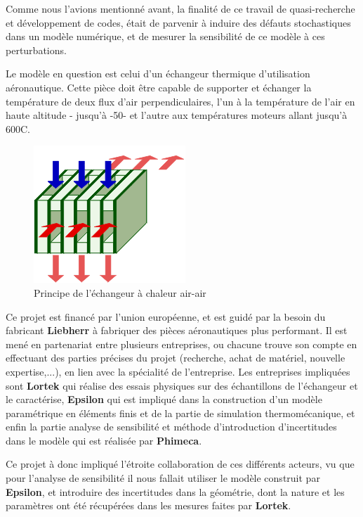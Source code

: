 \documentclass[a4paper,10pt]{article}
\begin{document}
Comme nous l'avions mentionné avant, la finalité de ce travail de quasi-recherche et développement de codes, était de parvenir à induire des défauts stochastiques dans un modèle numérique, et de mesurer la sensibilité de ce modèle à ces perturbations. 

Le modèle en question est celui d'un échangeur thermique d'utilisation aéronautique. Cette pièce doit être  capable de supporter et échanger la température de deux flux d'air perpendiculaires, l'un à la température de l'air en haute altitude - jusqu'à -50\degree - et l'autre aux températures moteurs allant jusqu'à 600C. \\

\begin{figure}[H]
   \centering   
   \includegraphics[scale=0.5]{principeEchangeur.png}
      \caption{Principe de l'échangeur à chaleur air-air}
         \label{principleExchanger}
\end{figure}

Ce projet est financé par l'union européenne, et est guidé par la besoin du fabricant \textbf{Liebherr} à fabriquer des pièces aéronautiques plus performant. Il est mené en partenariat entre plusieurs entreprises, ou chacune trouve son compte en effectuant des parties précises du projet (recherche, achat de matériel, nouvelle expertise,...), en lien avec la spécialité de l'entreprise.   \smallskip
Les entreprises impliquées sont \textbf{Lortek} qui réalise des essais physiques sur des échantillons de l'échangeur et le caractérise, \textbf{Epsilon} qui est impliqué dans la construction d'un modèle paramétrique en éléments finis et de la partie de simulation thermomécanique, et enfin la partie analyse de sensibilité et méthode d'introduction d'incertitudes dans le modèle qui est réalisée par \textbf{Phimeca}. \smallskip

Ce projet à donc impliqué l'étroite collaboration de ces différents acteurs, vu que pour l'analyse de sensibilité il nous fallait utiliser le modèle construit par \textbf{Epsilon}, et introduire des incertitudes dans la géométrie, dont la nature et les paramètres ont été récupérées dans les mesures faites par \textbf{Lortek}.
\end{document}
